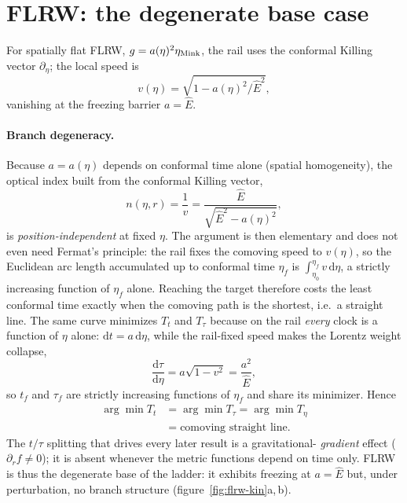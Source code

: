 \documentclass[12pt]{iopart}
\newcommand{\Ehat}{\hat E}
\newcommand{\dd}{\mathrm{d}}
\theoremstyle{plain}
\theoremstyle{definition}
\theoremstyle{plain}
\theoremstyle{remark}
\begin{document}
\section{FLRW: the degenerate base case}
\label{sec:flrw}
For spatially flat FLRW, $g=a(\eta)^2\eta_{\rm Mink}$, the rail uses the
conformal Killing vector $\partial_\eta$; the local speed is
\begin{equation}
    v(\eta)=\sqrt{1-a(\eta)^2/\Ehat^{2}},
    \label{eq:flrwspeed}
\end{equation}
vanishing at the freezing barrier $a=\Ehat$.
\paragraph{Branch degeneracy.} Because $a=a(\eta)$ depends on conformal time
alone (spatial homogeneity), the optical index built from the conformal Killing
vector,
\begin{equation}
    n(\eta,r)=\frac1v=\frac{\Ehat}{\sqrt{\Ehat^2-a(\eta)^2}},
    \label{eq:flrwindex}
\end{equation}
is \emph{position-independent} at fixed $\eta$. The argument is then elementary and does
not even need Fermat's principle: the rail fixes the comoving speed to $v(\eta)$, so the
Euclidean arc length accumulated up to conformal time $\eta_f$ is
$\int_{\eta_0}^{\eta_f}v\,\dd\eta$, a strictly increasing function of $\eta_f$ alone.
Reaching the target therefore costs the least conformal time exactly when the comoving
path is the shortest, i.e.\ a straight line. The same curve minimizes $T_t$ and $T_\tau$
because on the rail \emph{every} clock is a function of $\eta$ alone: $\dd t=a\,\dd\eta$,
while the rail-fixed speed makes the Lorentz weight collapse,
\begin{equation}
   \frac{\dd\tau}{\dd\eta}=a\sqrt{1-v^2}=\frac{a^2}{\Ehat},
   \label{eq:flrw-dtau}
\end{equation}
so $t_f$ and $\tau_f$ are strictly increasing functions of $\eta_f$ and share its
minimizer. Hence
\begin{equation}
\begin{split}
    \arg\min T_t&=\arg\min T_\tau=\arg\min T_\eta\\
    &=\text{comoving straight line}.
\end{split}
    \label{eq:flrwdegen}
\end{equation}
The $t/\tau$ splitting that drives every later result is a gravitational-%
\emph{gradient} effect ($\partial_r f\neq0$); it is absent whenever the metric
functions depend on time only. FLRW is thus the degenerate base of the ladder:
it exhibits freezing at $a=\Ehat$ but, under perturbation, no branch structure
(figure~\ref{fig:flrw-kin}a,\,b).
\end{document}
